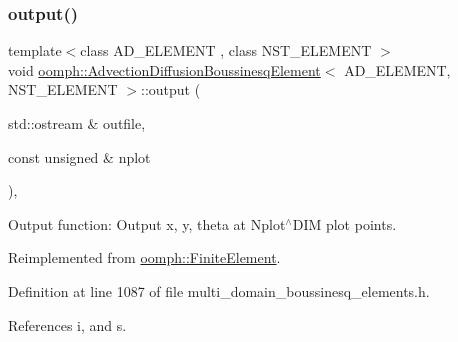 \mbox{\label{classoomph_1_1AdvectionDiffusionBoussinesqElement_afcb2b136650ecca8fd47eb4278616d29}} 
\subsubsection{\texorpdfstring{output()}{output()}\hspace{0.1cm}{\footnotesize\ttfamily [1/4]}}
{\footnotesize\ttfamily template$<$class A\+D\+\_\+\+E\+L\+E\+M\+E\+NT , class N\+S\+T\+\_\+\+E\+L\+E\+M\+E\+NT $>$ \\
void \hyperlink{classoomph_1_1AdvectionDiffusionBoussinesqElement}{oomph\+::\+Advection\+Diffusion\+Boussinesq\+Element}$<$ A\+D\+\_\+\+E\+L\+E\+M\+E\+NT, N\+S\+T\+\_\+\+E\+L\+E\+M\+E\+NT $>$\+::output (\begin{DoxyParamCaption}\item[{std\+::ostream \&}]{outfile,  }\item[{const unsigned \&}]{nplot }\end{DoxyParamCaption})\hspace{0.3cm}{\ttfamily [inline]}, {\ttfamily [virtual]}}



Output function\+: Output x, y, theta at Nplot$^\wedge$\+D\+IM plot points. 



Reimplemented from \hyperlink{classoomph_1_1FiniteElement_afa9d9b2670f999b43e6679c9dd28c457}{oomph\+::\+Finite\+Element}.



Definition at line 1087 of file multi\+\_\+domain\+\_\+boussinesq\+\_\+elements.\+h.



References i, and s.

\mbox{\label{classoomph_1_1AdvectionDiffusionBoussinesqElement_acc615c265bef2c3f5c30c6be95c0f50d}} 
